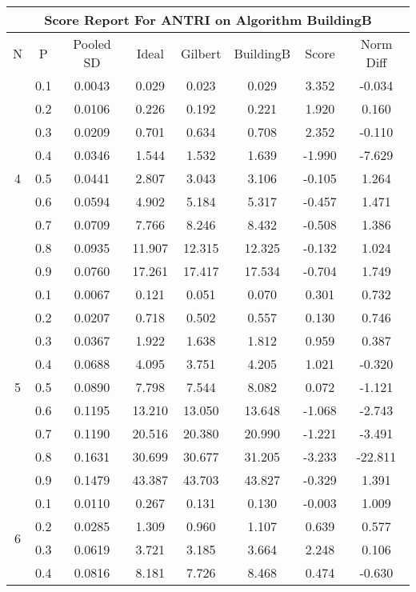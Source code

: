\documentclass[11pt,a4paper]{report}
\begin{document}
\begin{longtable}{ | c | c || c | c | c | c | c | c | }
\hline
\multicolumn{8}{|c|}{ Score Report For ANTRI on Algorithm BuildingB} \\
\hline
N & P & Pooled SD &  Ideal &  Gilbert & BuildingB  & Score & Norm Diff \\
 \hline
 \hline
 \endhead
\multirow{9}{*}{4} & 0.1 & 0.0043 & 0.029 & 0.023 & 0.029 & 3.352 & -0.034 \\
 & 0.2 & 0.0106 & 0.226 & 0.192 & 0.221 & 1.920 & 0.160 \\
 & 0.3 & 0.0209 & 0.701 & 0.634 & 0.708 & 2.352 & -0.110 \\
 & 0.4 & 0.0346 & 1.544 & 1.532 & 1.639 & -1.990 & -7.629 \\
 & 0.5 & 0.0441 & 2.807 & 3.043 & 3.106 & -0.105 & 1.264 \\
 & 0.6 & 0.0594 & 4.902 & 5.184 & 5.317 & -0.457 & 1.471 \\
 & 0.7 & 0.0709 & 7.766 & 8.246 & 8.432 & -0.508 & 1.386 \\
 & 0.8 & 0.0935 & 11.907 & 12.315 & 12.325 & -0.132 & 1.024 \\
 & 0.9 & 0.0760 & 17.261 & 17.417 & 17.534 & -0.704 & 1.749 \\
 \hline
\multirow{9}{*}{5} & 0.1 & 0.0067 & 0.121 & 0.051 & 0.070 & 0.301 & 0.732 \\
 & 0.2 & 0.0207 & 0.718 & 0.502 & 0.557 & 0.130 & 0.746 \\
 & 0.3 & 0.0367 & 1.922 & 1.638 & 1.812 & 0.959 & 0.387 \\
 & 0.4 & 0.0688 & 4.095 & 3.751 & 4.205 & 1.021 & -0.320 \\
 & 0.5 & 0.0890 & 7.798 & 7.544 & 8.082 & 0.072 & -1.121 \\
 & 0.6 & 0.1195 & 13.210 & 13.050 & 13.648 & -1.068 & -2.743 \\
 & 0.7 & 0.1190 & 20.516 & 20.380 & 20.990 & -1.221 & -3.491 \\
 & 0.8 & 0.1631 & 30.699 & 30.677 & 31.205 & -3.233 & -22.811 \\
 & 0.9 & 0.1479 & 43.387 & 43.703 & 43.827 & -0.329 & 1.391 \\
 \hline
\multirow{9}{*}{6} & 0.1 & 0.0110 & 0.267 & 0.131 & 0.130 & -0.003 & 1.009 \\
 & 0.2 & 0.0285 & 1.309 & 0.960 & 1.107 & 0.639 & 0.577 \\
 & 0.3 & 0.0619 & 3.721 & 3.185 & 3.664 & 2.248 & 0.106 \\
 & 0.4 & 0.0816 & 8.181 & 7.726 & 8.468 & 0.474 & -0.630 \\

\end{longtable}
\end{document}
